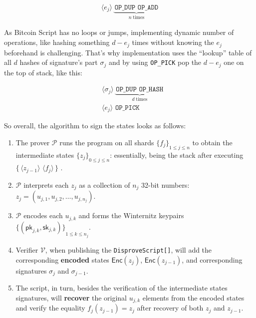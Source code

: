 \documentclass{iacrtrans}
\newcommand{\elem}[1]{\, \langle #1 \rangle \,}
\newcommand{\opcode}[1]{\, \texttt{#1} \,}
\newcommand{\script}[1]{ $\big\{ #1 \big\}$ }
\begin{document}
\begin{empheqboxed}
  \begin{align*}
    \elem{e_j} \underbrace{\opcode{OP\_DUP} \opcode{OP\_ADD}}_{n \;
    \text{times}}
  \end{align*}
\end{empheqboxed}

As Bitcoin Script has no loops or jumps, implementing dynamic number of
operations, like hashing something $d - e_j$ times without knowing the $e_j$
beforehand is challenging. That's why implementation uses the ``lookup'' table
of all $d$ hashes of signature's part $\sigma_j$ and by using \texttt{OP\_PICK}
pop the $d - e_j$ one on the top of stack, like this:

\begin{empheqboxed}
  \begin{align*}
    & \elem{\sigma_j} \underbrace{\opcode{OP\_DUP}
    \opcode{OP\_HASH}}_{d \; \text{times}} \\
    & \elem{e_j} \opcode{OP\_PICK}
  \end{align*}
\end{empheqboxed}

So overall, the algorithm to sign the states looks as follows:
\begin{enumerate}
  \item The prover $\mathcal{P}$ runs the program on all shards
    ${\{f_j\}}_{1 \leq
    j \leq n}$ to obtain the intermediate states ${\{z_j\}}_{0 \leq j \leq n}$:
    essentially, being the stack after executing \script{\elem{z_{j-1}}
    \elem{f_j}}.
  \item $\mathcal{P}$ interprets each $z_j$ as a collection of $n_j$ 32-bit
    numbers: $z_j = (u_{j,1}, u_{j,2}, \dots, u_{j, n_j})$.
  \item $\mathcal{P}$ encodes each $u_{j,k}$ and forms the Winternitz keypairs
    ${\{(\mathsf{pk}_{j,k},\mathsf{sk}_{j,k})\}}_{1 \leq k \leq n_j}$.
  \item Verifier $\mathcal{V}$, when publishing the
    \texttt{DisproveScript[]}, will add the corresponding
    \textbf{encoded} states $\mathsf{Enc}(z_j)$, $\mathsf{Enc}(z_{j-1})$, and
    corresponding signatures $\sigma_j$ and $\sigma_{j-1}$.
  \item The script, in turn, besides the verification of the intermediate states
    signatures, will \textbf{recover} the original $u_{j,k}$ elements from the
    encoded states and verify the equality $f_j(z_{j-1}) = z_j$ after
    recovery of
    both $z_j$ and $z_{j-1}$.
\end{enumerate}
\end{document}
